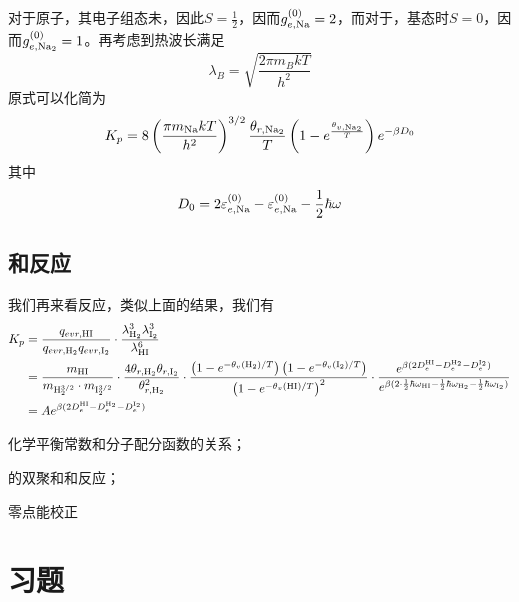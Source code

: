 对于原子，其电子组态未，因此$S=\frac{1}{2}$，因而$g_{e,\ce{Na}}^{(0)}=2$，而对于，基态时$S=0$，因而$g_{e,\ce{Na2}}^{(0)}=1$。再考虑到热波长满足\begin{equation}
    \lambda_B =\sqrt{\frac{2\pi m_B kT}{h^2}}
\end{equation}
原式可以化简为\begin{equation}
    K_p=8 \left(\frac{\pi m_{\ce{Na}}kT}{h^2}\right)^{3/2} \frac{\theta_{r,\ce{Na2}}}{T} \left(1-e^{\frac{\theta_{v,\ce{Na2}}}{T}}\right)e^{-\beta D_0}
\end{equation}
其中\begin{equation}
    D_0 = 2\varepsilon_{e,\ce{Na}}^{(0)} -\varepsilon_{e,\ce{Na}}^{(0)}-\frac{1}{2}\hbar\omega
\end{equation}
\subsection{和反应} %
\label{sub:H2和I2反应}
我们再来看反应，类似上面的结果，我们有\begin{equation}
    \begin{aligned}
        K_p& = \frac{q_{evr,\ce{HI}}}{q_{evr,\ce{H2}}q_{evr,\ce{I2}}} \cdot \frac{\lambda_{\ce{H2}}^3\lambda_{\ce{I2}}^3}{\lambda_{\ce{HI}}^6}\\
        &= \frac{m_{\ce{HI}}}{m_{\ce{H2}^{3/2}}\cdot m_{\ce{I2}^{3/2}}}\cdot \frac{4\theta_{r,\ce{H2} }\theta_{r,\ce{I2}}}{\theta_{r,\ce{H2}}^2} \cdot \frac{\left(1-e^{-\theta_v(\ce{H2})/T}\right)\left(1-e^{-\theta_v(\ce{I2})/T}\right)}{\left(1-e^{-\theta_v(\ce{HI})/T}\right)^2} \cdot \frac{e^{\beta (2D_{e}^{\ce{HI}}-D_{e}^{\ce{H2}}-D_{e}^{\ce{I2}})}}{e^{\beta (2\cdot \frac{1}{2} \hbar \omega_{\ce{HI}}-\frac{1}{2}\hbar\omega_{\ce{H2}}-\frac{1}{2}\hbar\omega_{\ce{I2}})} }\\
        &=Ae^{\beta (2D_{e}^{\ce{HI}}-D_{e}^{\ce{H2}}-D_{e}^{\ce{I2}})}
    \end{aligned}
\end{equation}

\begin{review}
    \item 化学平衡常数和分子配分函数的关系；
    \item {}的双聚和和反应；
    \item 零点能校正
\end{review}
\section{习题} %
\label{sec:习题gas reaction}

